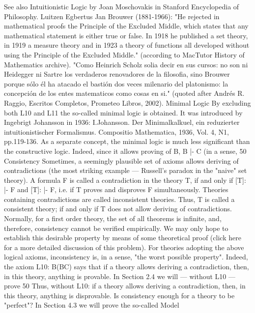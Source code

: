 See also Intuitionistic Logic by Joan Moschovakis in Stanford Encyclopedia of Philosophy.
Luitzen Egbertus Jan Brouwer (1881-1966): "He rejected in mathematical proofs the Principle of the Excluded Middle, which
states that any mathematical statement is either true or false. In 1918 he published a set theory, in 1919 a measure theory and in
1923 a theory of functions all developed without using the Principle of the Excluded Middle." (according to MacTutor History
of Mathematics archive). "Como Heinrich Scholz solia decir en sus cursos: no son ni Heidegger ni Sartre los verdaderos
renovadores de la filosofia, sino Brouwer porque sólo él ha atacado el bastión dos veces milenario del platonismo: la
concepción de los entes matematicos como cosas en si." (quoted after Andrés R. Raggio, Escritos Completos, Prometeo Libros,
2002).
Minimal Logic
By excluding both L10 and L11 the so-called minimal logic is obtained. It was introduced by Ingebrigt
Johansson in 1936:
I.Johansson. Der Minimalkalkuel, ein reduzierter intuitionistischer Formalismus. Compositio Mathematica, 1936, Vol. 4, N1,
pp.119-136.
As a separate concept, the minimal logic is much less significant than the constructive logic. Indeed, since
it allows proving of \neg B, B |- \neg C (in a sense, 50%
Consistency
Sometimes, a seemingly plausible set of axioms allows deriving of contradictions (the most striking
example --- Russell's paradox in the "naive" set theory). A formula F is called a contradiction in the
theory T, if and only if [T]: |- F and [T]: |- \neg F, i.e. if T proves and disproves F simultaneously. Theories
containing contradictions are called inconsistent theories. Thus, T is called a consistent theory; if and
only if T does not allow deriving of contradictions.
Normally, for a first order theory, the set of all theorems is infinite, and, therefore, consistency cannot be
verified empirically. We may only hope to establish this desirable property by means of some
theoretical proof (click here for a more detailed discussion of this problem).
For theories adopting the above logical axioms, inconsistency is, in a sense, "the worst possible property".
Indeed, the axiom L10: \neg B\IMPLIES (B\IMPLIES C) says that if a theory allows deriving a contradiction, then, in this
theory, anything is provable. In Section 2.4 we will --- without L10 --- prove 50%
Thus, without L10: if a theory allows deriving a contradiction, then, in this theory, anything is
disprovable.
Is consistency enough for a theory to be "perfect"? In Section 4.3 we will prove the so-called Model
